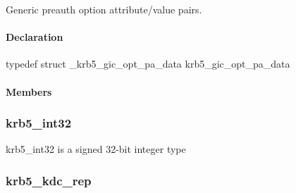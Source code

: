 \documentclass[letterpaper,10pt,english]{sphinxmanual}
\begin{document}
Generic preauth option attribute/value pairs.


\paragraph{Declaration}
\label{appdev/refs/types/krb5_gic_opt_pa_data:declaration}
typedef struct \_krb5\_gic\_opt\_pa\_data  krb5\_gic\_opt\_pa\_data


\paragraph{Members}
\label{appdev/refs/types/krb5_gic_opt_pa_data:members}

\begin{fulllineitems}
\label{appdev/refs/types/krb5_gic_opt_pa_data:krb5_gic_opt_pa_data.attr}
\end{fulllineitems}


\begin{fulllineitems}
\label{appdev/refs/types/krb5_gic_opt_pa_data:krb5_gic_opt_pa_data.value}
\end{fulllineitems}



\subsubsection{krb5\_int32}
\label{appdev/refs/types/krb5_int32:krb5-int32-struct}\label{appdev/refs/types/krb5_int32::doc}\label{appdev/refs/types/krb5_int32:krb5-int32}

\begin{fulllineitems}
\label{appdev/refs/types/krb5_int32:krb5_int32}
\end{fulllineitems}


krb5\_int32 is a signed 32-bit integer type


\subsubsection{krb5\_kdc\_rep}
\label{appdev/refs/types/krb5_kdc_rep::doc}\label{appdev/refs/types/krb5_kdc_rep:krb5-kdc-rep}\label{appdev/refs/types/krb5_kdc_rep:krb5-kdc-rep-struct}
\end{document}
